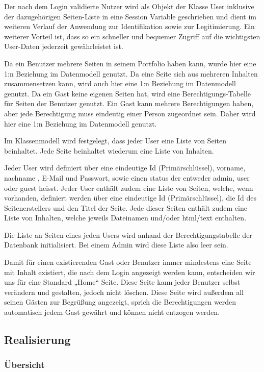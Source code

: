 \documentclass[10.5pt]{scrarticle}
\begin{document}
Der nach dem Login validierte Nutzer wird als Objekt der Klasse User inklusive der dazugehörigen Seiten-Liste in eine Session Variable geschrieben und dient im weiteren Verlauf der Anwendung zur Identifikation sowie zur Legitimierung. Ein weiterer Vorteil ist, dass so ein schneller und bequemer Zugriff auf die wichtigsten User-Daten jederzeit gewährleistet ist.

Da ein Benutzer mehrere Seiten in seinem Portfolio haben kann, wurde hier eine 1:n Beziehung im Datenmodell genutzt.
Da eine Seite sich aus mehreren Inhalten zusammensetzen kann, wird auch hier eine 1:n Beziehung im Datenmodell genutzt. 
Da ein Gast keine eigenen Seiten hat, wird eine Berechtigungs-Tabelle für Seiten der Benutzer genutzt. Ein Gast kann mehrere Berechtigungen haben, aber jede Berechtigung muss eindeutig einer Person zugeordnet sein. Daher wird hier eine 1:n Beziehung im Datenmodell genutzt.

Im Klassenmodell wird festgelegt, dass jeder User eine Liste von Seiten beinhaltet.
Jede Seite beinhaltet wiederum eine Liste von Inhalten.

Jeder User wird definiert über eine eindeutige Id (Primärschlüssel), vorname, nachname , E-Mail und Passwort, sowie einen status der entweder admin, user oder guest heisst.
Jeder User enthält zudem eine Liste von Seiten, welche, wenn vorhanden, definiert werden über eine eindeutige Id (Primärschlüssel), die Id des Seitenerstellers und den Titel der Seite.
Jede dieser Seiten enthält zudem eine Liste von Inhalten, welche jeweils Dateinamen und/oder html/text enthalten.

Die Liste an Seiten eines jeden Users wird anhand der Berechtigungstabelle der Datenbank initialisiert. Bei einem Admin wird diese Liste also leer sein.

Damit für einen existierenden Gast oder Benutzer immer mindestens eine Seite mit Inhalt existiert, die nach dem Login angezeigt werden kann, entscheiden wir uns für eine Standard „Home“ Seite.
Diese Seite kann jeder Benutzer selbst verändern und gestalten, jedoch nicht löschen. Diese Seite wird au{\ss}erdem all seinen Gästen zur Begrü{\ss}ung angezeigt, sprich die Berechtigungen werden automatisch jedem Gast gewährt und können nicht entzogen werden.

\subsection{Realisierung}
\subsubsection{Übersicht}
\end{document}
